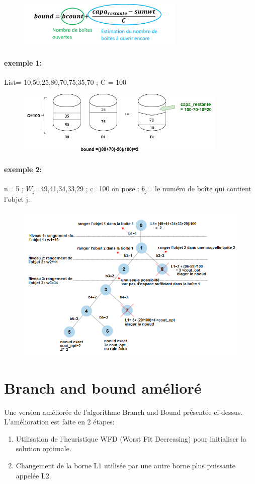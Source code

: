 \documentclass[12pt]{article}
\begin{document}
\begin{figure}[h!]
    \includegraphics[width=8cm]{../figures/formule1.png}
\end{figure}
\paragraph{exemple 1: }
List= {10,50,25,80,70,75,35,70} ;   C = 100 
\begin{figure}[h!]
    \includegraphics[width=10cm]{../figures/example1.png}
\end{figure}
\paragraph{exemple 2: }
n= 5 ; $W_{j}$={49,41,34,33,29} ; c=100 
on pose : $b_j$= le numéro de boîte qui contient l’objet j.

\begin{figure}[h!]
    \includegraphics[width=\linewidth]{../figures/diag2.png}
\end{figure}
\section{Branch and bound amélioré}
Une version améliorée de l’algorithme Branch and Bound présentée ci-dessus. L’amélioration est faite en 2 étapes: 
\begin{enumerate}
    \item Utilisation de l’heuristique WFD (Worst Fit Decreasing) pour initialiser la solution optimale.
    \item Changement de la borne L1 utilisée par une autre borne plus puissante appelée L2. 
\end{enumerate}
\end{document}
